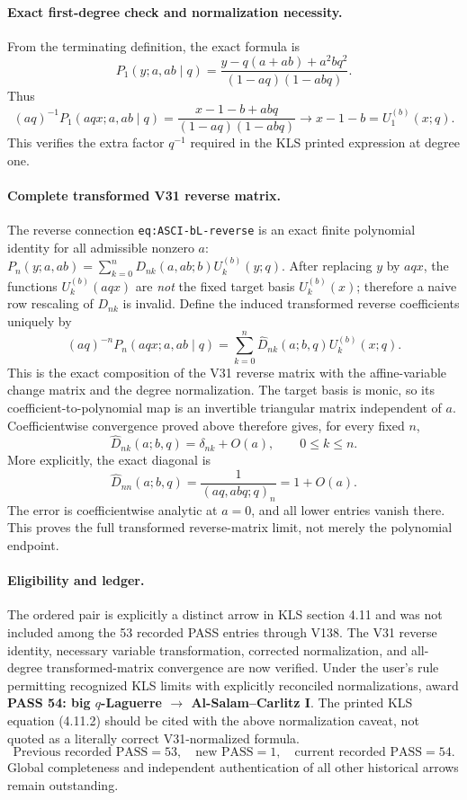 \documentclass[11pt]{article}
\begin{document}
\paragraph{Exact first-degree check and normalization necessity.}
From the terminating definition, the exact formula is
\[
 P_1(y;a,ab\mid q)
 =\frac{y-q(a+ab)+a^2bq^2}{(1-aq)(1-abq)}.
\]
Thus
\[
 (aq)^{-1}P_1(aqx;a,ab\mid q)
 =\frac{x-1-b+abq}{(1-aq)(1-abq)}\to x-1-b=U_1^{(b)}(x;q).
\]
This verifies the extra factor $q^{-1}$ required in the KLS printed expression at degree one.

\paragraph{Complete transformed V31 reverse matrix.}
The reverse connection \texttt{eq:ASCI-bL-reverse} is an exact finite polynomial identity for all admissible nonzero $a$:
$P_n(y;a,ab)=\sum_{k=0}^n D_{nk}(a,ab;b)U_k^{(b)}(y;q)$.
After replacing $y$ by $aqx$, the functions $U_k^{(b)}(aqx)$ are \emph{not} the fixed target basis $U_k^{(b)}(x)$; therefore a naive row rescaling of $D_{nk}$ is invalid.
Define the induced transformed reverse coefficients uniquely by
\[
 (aq)^{-n}P_n(aqx;a,ab\mid q)
 =\sum_{k=0}^n\widehat D_{nk}(a;b,q)U_k^{(b)}(x;q).
\]
This is the exact composition of the V31 reverse matrix with the affine-variable change matrix and the degree normalization. The target basis is monic, so its coefficient-to-polynomial map is an invertible triangular matrix independent of $a$. Coefficientwise convergence proved above therefore gives, for every fixed $n$,
\[
 \boxed{\widehat D_{nk}(a;b,q)=\delta_{nk}+O(a),\qquad 0\le k\le n.}
\]
More explicitly, the exact diagonal is
\[
 \boxed{\widehat D_{nn}(a;b,q)=\frac{1}{(aq,abq;q)_n}=1+O(a).}
\]
The error is coefficientwise analytic at $a=0$, and all lower entries vanish there. This proves the full transformed reverse-matrix limit, not merely the polynomial endpoint.

\paragraph{Eligibility and ledger.}
The ordered pair is explicitly a distinct arrow in KLS section 4.11 and was not included among the 53 recorded PASS entries through V138. The V31 reverse identity, necessary variable transformation, corrected normalization, and all-degree transformed-matrix convergence are now verified. Under the user's rule permitting recognized KLS limits with explicitly reconciled normalizations, award \textbf{PASS 54: big $q$-Laguerre $\to$ Al-Salam--Carlitz I}. The printed KLS equation (4.11.2) should be cited with the above normalization caveat, not quoted as a literally correct V31-normalized formula.
\[
 \boxed{\text{Previous recorded PASS}=53,\quad\text{new PASS}=1,\quad\text{current recorded PASS}=54.}
\]
Global completeness and independent authentication of all other historical arrows remain outstanding.
\end{document}
